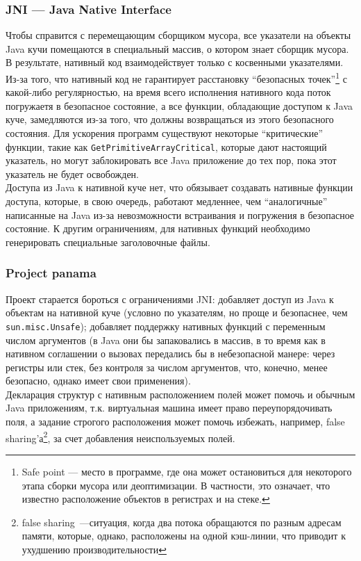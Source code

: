\documentclass[times,specification,annotation]{itmo-student-thesis}
\begin{document}
\subsubsection{JNI --- Java Native Interface}
Чтобы справится с перемещающим сборщиком мусора, все указатели на объекты Java кучи помещаются в специальный массив, о котором знает сборщик мусора. В результате, нативный код взаимодействует только с косвенными указателями. Из-за того, что нативный код не гарантирует расстановку ``безопасных точек''\footnote{Safe point --- место в программе, где она может остановиться для некоторого этапа сборки мусора или деоптимизации. В частности, это означает, что известно расположение объектов в регистрах и на стеке.} с какой-либо регулярностью, на время всего исполнения нативного кода поток погружаетя в безопасное состояние, а все функции, обладающие доступом к Java куче, замедляются из-за того, что должны возвращаться из этого безопасного состояния. Для ускорения программ существуют некоторые ``критические'' функции, такие как \texttt{GetPrimitiveArrayCritical}, которые дают настоящий указатель, но могут заблокировать все Java приложение до тех пор, пока этот указатель не будет освобожден.\\
Доступа из Java к нативной куче нет, что обязывает создавать нативные функции доступа, которые, в свою очередь, работают медленнее, чем ``аналогичные'' написанные на Java из-за невозможности встраивания и погружения в безопасное состояние. К другим ограничениям, для нативных функций необходимо генерировать специальные заголовочные файлы.\\
\subsubsection{Project panama}
Проект старается бороться с ограничениями JNI: добавляет доступ из Java к объектам на нативной куче (условно по указателям, но проще и безопаснее, чем \texttt{sun.misc.Unsafe}); добавляет поддержку нативных функций с переменным числом аргументов (в Java они бы запаковались в массив, в то время как в нативном соглашении о вызовах передались бы в небезопасной манере: через регистры или стек, без контроля за числом аргументов, что, конечно, менее безопасно, однако имеет свои применения).\\
Декларация структур с нативным расположением полей может помочь и обычным Java приложениям, т.к. виртуальная машина имеет право переупорядочивать поля, а задание строгого расположения может помочь избежать, например, false sharing'а\footnote{false sharing~---ситуация, когда два потока обращаются по разным адресам памяти, которые, однако, расположены на одной кэш-линии, что приводит к ухудшению производительности}, за счет добавления неиспользуемых полей.
\end{document}
